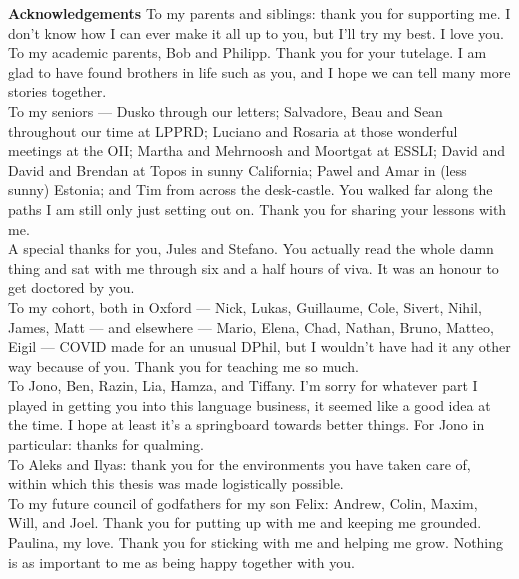 \clearpage
\newpage
\vfill
\begin{myboxB}
\centering
\textbf{Acknowledgements}
To my parents and siblings: thank you for supporting me. I don't know how I can ever make it all up to you, but I'll try my best. I love you.\\

To my academic parents, Bob and Philipp. Thank you for your tutelage. I am glad to have found brothers in life such as you, and I hope we can tell many more stories together.\\

To my seniors --- Dusko through our letters; Salvadore, Beau and Sean throughout our time at LPPRD; Luciano and Rosaria at those wonderful meetings at the OII; Martha and Mehrnoosh and Moortgat at ESSLI; David and David and Brendan at Topos in sunny California; Pawel and Amar in (less sunny) Estonia; and Tim from across the desk-castle. You walked far along the paths I am still only just setting out on. Thank you for sharing your lessons with me.\\

A special thanks for you, Jules and Stefano. You actually read the whole damn thing and sat with me through six and a half hours of viva. It was an honour to get doctored by you.\\

To my cohort, both in Oxford --- Nick, Lukas, Guillaume, Cole, Sivert, Nihil, James, Matt --- and elsewhere --- Mario, Elena, Chad, Nathan, Bruno, Matteo, Eigil --- COVID made for an unusual DPhil, but I wouldn't have had it any other way because of you. Thank you for teaching me so much.\\

To Jono, Ben, Razin, Lia, Hamza, and Tiffany. I'm sorry for whatever part I played in getting you into this language business, it seemed like a good idea at the time. I hope at least it's a springboard towards better things. For Jono in particular: thanks for qualming.\\

To Aleks and Ilyas: thank you for the environments you have taken care of, within which this thesis was made logistically possible.\\

To my future council of godfathers for my son Felix: Andrew, Colin, Maxim, Will, and Joel. Thank you for putting up with me and keeping me grounded.\\

Paulina, my love. Thank you for sticking with me and helping me grow. Nothing is as important to me as being happy together with you.
\end{myboxB}
